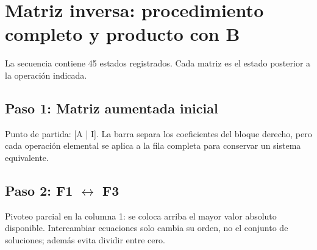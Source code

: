 \documentclass[conference]{IEEEtran}
\begin{document}

\medskip
\section{Matriz inversa: procedimiento completo y producto con B}
La secuencia contiene 45 estados registrados. Cada matriz es el estado posterior a la operación indicada.
\subsection*{Paso 1: Matriz aumentada inicial}
Punto de partida: [A | I]. La barra separa los coeficientes del bloque derecho, pero cada operación elemental se aplica a la fila completa para conservar un sistema equivalente.


\medskip
\subsection*{Paso 2: F1 \(\leftrightarrow\) F3}
Pivoteo parcial en la columna 1: se coloca arriba el mayor valor absoluto disponible. Intercambiar ecuaciones solo cambia su orden, no el conjunto de soluciones; además evita dividir entre cero.

\end{document}
